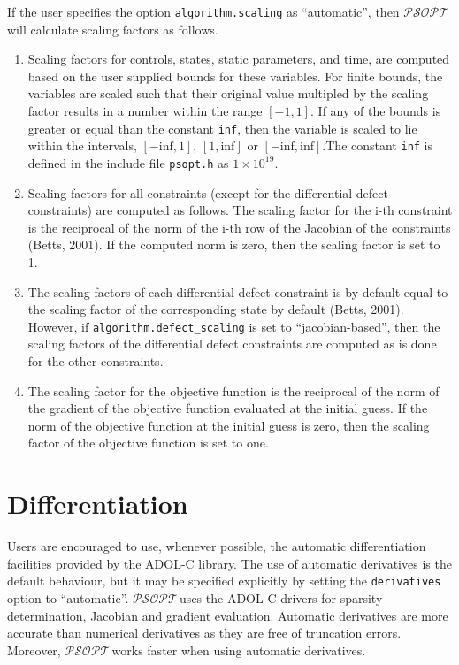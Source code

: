 \documentclass[a4paper,11pt]{report}    %
\newcommand{\psopt}{$\mathcal{PSOPT}$\,}  %
\begin{document}
If the user specifies the option \texttt{algorithm.scaling} as ``automatic'', then \psopt will calculate
scaling factors as follows.

\begin{enumerate}
 \item  Scaling factors for controls, states, static parameters, and time, are computed based
on the user supplied bounds for these variables. For finite bounds, the variables are scaled
such that their original value multipled by the scaling factor results in a number within
the range $[-1,1]$. If any of the bounds is greater or equal than the constant \texttt{inf}, then the
variable is scaled to lie within the intervals, $[-\mathrm{inf}, 1]$, $[1, \mathrm{inf}]$ or 
$[-\mathrm{inf}, \mathrm{inf}]$.The constant \texttt{inf} is defined in the include file 
\texttt{psopt.h} as $1 \times 10^{19}$. 
\item Scaling factors for all constraints (except for the differential defect constraints) are 
computed as follows. The scaling factor for the i-th constraint is the reciprocal of the norm
of the i-th row of the Jacobian of the constraints (Betts, 2001). If the computed norm is zero, then the scaling
factor is set to 1. 
 \item The scaling factors of each differential defect constraint is by default equal to the scaling factor
of the corresponding state by default (Betts, 2001). However, if \verb|algorithm.defect_scaling| is set
to ``jacobian-based'', then the scaling factors of the differential defect constraints are computed
as is done for the other constraints.
 \item The scaling factor for the objective function is the reciprocal of the norm of the
gradient of the objective function evaluated at the initial guess. If the norm of the objective
function at the initial guess is zero, then the scaling factor of the objective function is set
to one.
\end{enumerate}

\section{Differentiation}


Users are encouraged to use, whenever possible, the automatic differentiation facilities provided by
the ADOL-C library. The use of automatic derivatives is the default behaviour, but it may be specified explicitly
by setting the  \texttt{derivatives} option to ``automatic''.  
 \psopt uses the ADOL-C drivers for sparsity determination, Jacobian and gradient evaluation.
Automatic derivatives are more accurate than numerical derivatives as they
are free of truncation errors. Moreover, \psopt works faster when using automatic derivatives.
\end{document}
